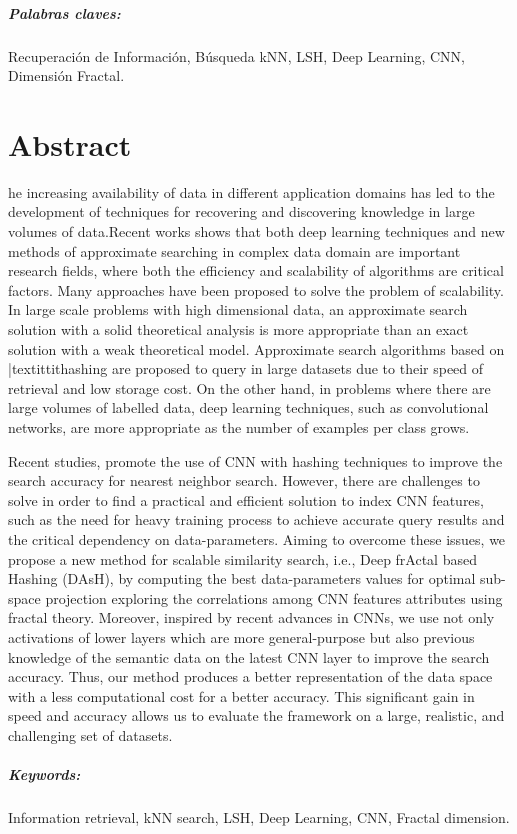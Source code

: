 \begin{SingleSpace}
 
\paragraph{Palabras claves:}
Recuperación de Información, Búsqueda kNN, LSH, Deep Learning,  CNN, Dimensión Fractal.


\end{SingleSpace}
\clearpage



\chapter*{Abstract}
\begin{SingleSpace}
he increasing availability of data in different application domains has led to the development of techniques for recovering and discovering knowledge in large volumes of data.Recent works shows that both deep learning techniques and new methods of approximate searching in complex data domain are important research fields, where both the efficiency and scalability of algorithms are critical factors. Many approaches have been proposed to solve the problem of scalability. In large scale problems with high dimensional data, an approximate search solution with a solid theoretical analysis is more appropriate than an exact solution with a weak theoretical model.    Approximate search algorithms based on |textittit{hashing} are proposed to query in large datasets due to their speed of retrieval and low storage cost.  On the other hand, in problems where there are large volumes of labelled data, deep learning techniques, such as convolutional networks, are more appropriate as the number of examples per class grows.

Recent studies, promote the use of  \ac{CNN} with hashing techniques to improve the search accuracy for nearest neighbor search. However, there are challenges to solve in order to find a practical and efficient solution to index CNN features, such as the need for heavy training process to achieve accurate query results and the critical dependency on data-parameters.   Aiming to overcome these issues, we propose a new method for scalable similarity search, i.e., Deep frActal based  Hashing (DAsH), by computing the best data-parameters values for optimal sub-space projection  exploring the correlations among CNN features attributes using fractal theory. Moreover, inspired by recent advances in CNNs, we use not only activations of lower layers which are more general-purpose but also previous knowledge of the semantic data on the latest CNN layer to improve the search accuracy.  Thus, our method produces a better representation of the data space with a less computational cost for a better accuracy.  This significant gain in speed and accuracy allows us to evaluate the framework on a  large, realistic, and challenging set of datasets.  
 
\paragraph{Keywords:}
Information retrieval, kNN search, LSH, Deep Learning, CNN, Fractal dimension. 

\end{SingleSpace}
\clearpage